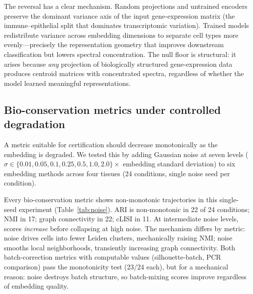 \documentclass[11pt]{article}
\begin{document}
The reversal has a clear mechanism. Random projections and untrained
encoders preserve the dominant variance axis of the input gene-expression
matrix (the immune--epithelial split that dominates transcriptomic
variation). Trained models redistribute variance across embedding
dimensions to separate cell types more evenly---precisely the
representation geometry that improves downstream classification but
lowers spectral concentration. The null floor is structural: it
arises because \emph{any} projection of biologically structured
gene-expression data produces centroid matrices with concentrated
spectra, regardless of whether the model learned meaningful
representations.


\subsection{Bio-conservation metrics under controlled degradation}
\label{sec:noise}

A metric suitable for certification should decrease monotonically as the
embedding is degraded. We tested this by adding Gaussian noise at seven
levels ($\sigma \in \{0.01, 0.05, 0.1, 0.25, 0.5, 1.0, 2.0\} \times$
embedding standard deviation) to six embedding methods across four
tissues (24 conditions, single noise seed per condition).

Every bio-conservation metric shows non-monotonic trajectories in this
single-seed experiment (Table~\ref{tab:noise}). ARI is non-monotonic in
22 of 24 conditions; NMI in 17; graph connectivity in 22; cLISI in 11.
At intermediate noise levels, scores \emph{increase} before collapsing
at high noise. The mechanism differs by metric: noise drives cells into
fewer Leiden clusters, mechanically raising NMI; noise smooths local
neighborhoods, transiently increasing graph connectivity. Both
batch-correction metrics with computable values (silhouette-batch, PCR
comparison) pass the monotonicity test (23/24 each), but for a
mechanical reason: noise destroys batch structure, so batch-mixing
scores improve regardless of embedding quality.
\end{document}
